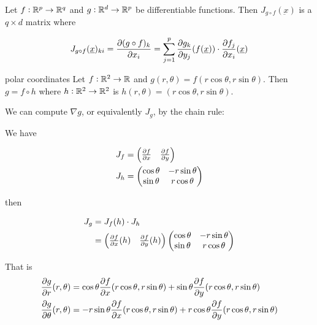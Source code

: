 \documentclass[12pt]{report}
\renewcommand{\vec}[1]{\underbar{\ensuremath{#1}}}
\begin{document}
\begin{example}
    Let $f: \mathbb{R}^p \to \mathbb{R}^q$ and $g: \mathbb{R}^d \to \mathbb{R}^p$ be differentiable functions.
    Then $J_{g \circ f}(\vec{x})$ is a $q \times d$ matrix where

    $$
        J_{g \circ f}(\vec{x})_{ki} =
        \pdv{(g \circ f)_k}{x_i}() = \sum_{j=1}^p \pdv{g_k}{y_j}()(f(\vec{x})) \cdot \pdv{f_j}{x_i}()(\vec{x})
    $$
\end{example}

\begin{example}{polar coordinates}
    Let $f: \mathbb{R}^2 \to \mathbb{R}$ and $g(r, \theta) = f(r \cos \theta, r \sin \theta)$.
    Then $g = f \circ h$ where $h: \mathbb{R}^2 \to \mathbb{R}^2$ is $h(r, \theta) = (r \cos \theta, r \sin \theta)$.

    We can compute $\nabla g$, or equivalently $J_g$, by the chain rule:

    We have

    \begin{align*}
        J_f & = \begin{pmatrix}
                    \pdv{f}{x}() & \pdv{f}{y}()
                \end{pmatrix}  \\
        J_h & = \begin{pmatrix}
                    \cos \theta & -r \sin \theta \\
                    \sin \theta & r \cos \theta
                \end{pmatrix}
    \end{align*}

    then

    \begin{align*}
        J_g & = J_f(h) \cdot J_h                  \\
            & = \begin{pmatrix}
                    \pdv{f}{x}()(h) & \pdv{f}{y}()(h)
                \end{pmatrix}
        \begin{pmatrix}
            \cos \theta & -r \sin \theta \\
            \sin \theta & r \cos \theta
        \end{pmatrix}
    \end{align*}

    That is
    \begin{align*}
        \pdv{g}{r}()(r, \theta)      & = \cos \theta \pdv{f}{x}()(r \cos \theta, r \sin \theta) + \sin \theta \pdv{f}{y}()(r \cos \theta, r \sin \theta)      \\
        \pdv{g}{\theta}()(r, \theta) & = -r \sin \theta \pdv{f}{x}()(r \cos \theta, r \sin \theta) + r \cos \theta \pdv{f}{y}()(r \cos \theta, r \sin \theta)
    \end{align*}

\end{example}
\end{document}
